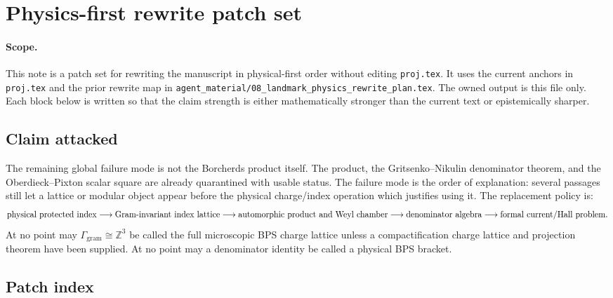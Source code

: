 \section{Physics-first rewrite patch set}

\paragraph{Scope.}
This note is a patch set for rewriting the manuscript in physical-first
order without editing \texttt{proj.tex}.  It uses the current anchors in
\texttt{proj.tex} and the prior rewrite map in
\texttt{agent\_material/08\_landmark\_physics\_rewrite\_plan.tex}.  The
owned output is this file only.  Each block below is written so that the
claim strength is either mathematically stronger than the current text or
epistemically sharper.

\subsection{Claim attacked}

The remaining global failure mode is not the Borcherds product itself.
The product, the Gritsenko--Nikulin denominator theorem, and the
Oberdieck--Pixton scalar square are already quarantined with usable
status.  The failure mode is the order of explanation: several passages
still let a lattice or modular object appear before the physical
charge/index operation which justifies using it.  The replacement policy is:
\[
\hbox{physical protected index}
\longrightarrow
\hbox{Gram-invariant index lattice}
\longrightarrow
\hbox{automorphic product and Weyl chamber}
\longrightarrow
\hbox{denominator algebra}
\longrightarrow
\hbox{formal current/Hall problem}.
\]
At no point may \(\Gamma_{\mathrm{gram}}\cong \mathbb Z^3\) be called the
full microscopic BPS charge lattice unless a compactification charge
lattice and projection theorem have been supplied.  At no point may a
denominator identity be called a physical BPS bracket.

\subsection{Patch index}

